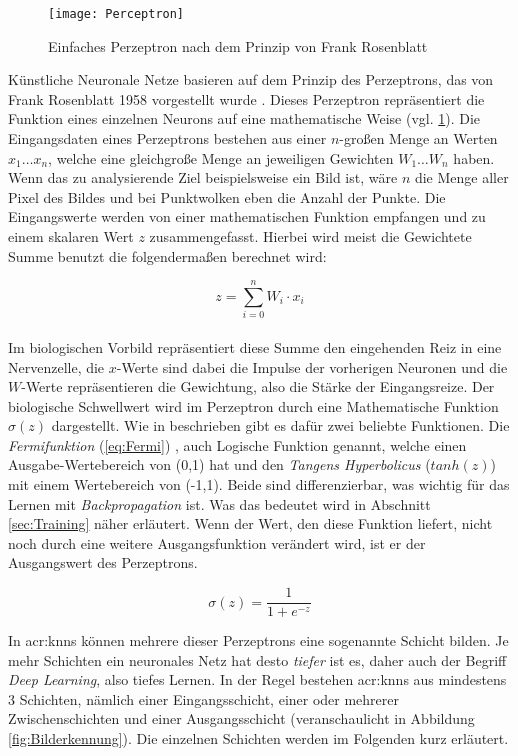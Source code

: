 \begin{figure}%
	\centering
    \texttt{[image: Perceptron]}
    \caption{Einfaches Perzeptron nach dem Prinzip von Frank Rosenblatt}
    \label{fig:Perceptron}
\end{figure}

Künstliche Neuronale Netze basieren auf dem Prinzip des Perzeptrons, das von Frank Rosenblatt 1958 vorgestellt wurde \cite{bib:Perzeptron}. Dieses Perzeptron repräsentiert die Funktion eines einzelnen Neurons auf eine mathematische Weise (vgl. \ref{fig:Perceptron}). Die Eingangsdaten eines Perzeptrons bestehen aus einer \(n\)-großen Menge an Werten \(x_1 \dots x_n\), welche eine gleichgroße Menge an jeweiligen Gewichten \(W_1 \dots W_n\) haben. Wenn das zu analysierende Ziel beispielsweise ein Bild ist, wäre \(n\) die Menge aller Pixel des Bildes und bei Punktwolken eben die Anzahl der Punkte. Die Eingangswerte werden von einer mathematischen Funktion empfangen und zu einem skalaren Wert \(z\) zusammengefasst. Hierbei wird meist die Gewichtete Summe benutzt die folgendermaßen berechnet wird:

\begin{equation}
z = \sum \limits_{i=0}^{n} W_i \cdot x_i
\end{equation}\\

Im biologischen Vorbild repräsentiert diese Summe den eingehenden Reiz in eine Nervenzelle, die \(x\)-Werte sind dabei die Impulse der vorherigen Neuronen und die \(W\)-Werte repräsentieren die Gewichtung, also die Stärke der Eingangsreize. Der biologische Schwellwert wird im Perzeptron durch eine Mathematische Funktion \(\sigma(z)\) dargestellt. Wie in \cite{bib:NeuronaleNetze} beschrieben gibt es dafür zwei beliebte Funktionen. Die \textit{Fermifunktion} (\ref{eq:Fermi}) , auch Logische Funktion genannt, welche einen Ausgabe-Wertebereich von (0,1) hat und den \textit{Tangens Hyperbolicus} (\(tanh(z)\)) mit einem Wertebereich von (-1,1). Beide sind differenzierbar, was wichtig für das Lernen mit \textit{Backpropagation} ist. Was das bedeutet wird in Abschnitt \ref{sec:Training} näher erläutert. Wenn der Wert, den diese Funktion liefert, nicht noch durch eine weitere Ausgangsfunktion verändert wird, ist er der Ausgangswert des Perzeptrons.

\begin{equation}
\sigma(z) = \frac{1}{1 + e^{-z}}
\label{eq:Fermi}
\end{equation}

In \acrshort{acr:knn}s können mehrere dieser Perzeptrons eine sogenannte Schicht bilden. Je mehr Schichten ein neuronales Netz hat desto \textit{tiefer} ist es, daher auch der Begriff \textit{Deep Learning}, also tiefes Lernen. In der Regel bestehen \acrshort{acr:knn}s aus mindestens 3 Schichten, nämlich einer Eingangsschicht, einer oder mehrerer Zwischenschichten und einer Ausgangsschicht (veranschaulicht in Abbildung \ref{fig:Bilderkennung}). Die einzelnen Schichten werden im Folgenden kurz erläutert.  

